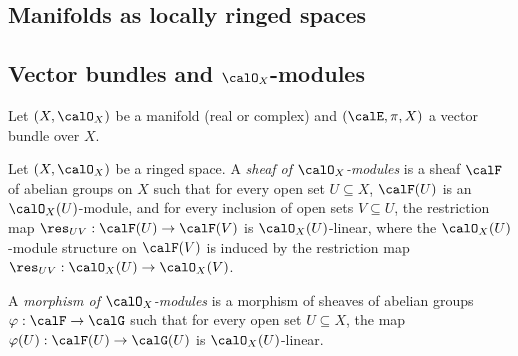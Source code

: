 \subsection{Manifolds as locally ringed spaces}

    

\subsection[Vector bundles and O\_X-modules]{Vector bundles and \(\calO_X\)-modules}

    Let \((X,\calO_X)\) be a manifold (real or complex) and \((\calE, \pi, X)\) a vector bundle over \(X\).


    \begin{definition}\label{def:sheaf_of_modules}
        Let \((X,\calO_X)\) be a ringed space.
        A \emph{sheaf of \(\calO_X\)-modules} is a sheaf \(\calF\) of abelian groups on \(X\) such that for every open set \(U\subseteq X\), 
        \(\calF(U)\) is an \(\calO_X(U)\)-module, 
        and for every inclusion of open sets \(V\subseteq U\), the restriction map \(\res_{UV}:\calF(U)\to \calF(V)\) is \(\calO_X(U)\)-linear, 
        where the \(\calO_X(U)\)-module structure on \(\calF(V)\) is induced by the restriction map \(\res_{UV}:\calO_X(U)\to \calO_X(V)\).
        
        A \emph{morphism of \(\calO_X\)-modules} is a morphism of sheaves of abelian groups \(\varphi:\calF\to \calG\) such that 
        for every open set \(U\subseteq X\), the map \(\varphi(U):\calF(U)\to \calG(U)\) is \(\calO_X(U)\)-linear.
    \end{definition}


    

